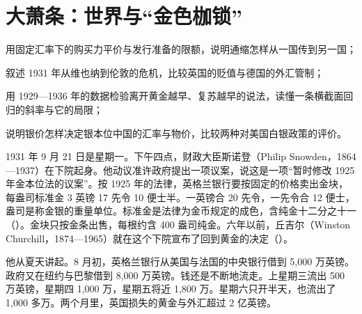 \chapter{大萧条：世界与“金色枷锁”}\label{ch:depressionworld}

\begin{chapterguide}
\begin{guidegoals}
\item 用固定汇率下的购买力平价与发行准备的限额，说明通缩怎样从一国传到另一国；
\item 叙述 1931 年从维也纳到伦敦的危机，比较英国的贬值与德国的外汇管制；
\item 用 1929—1936 年的数据检验离开黄金越早、复苏越早的说法，读懂一条横截面回归的斜率与它的局限；
\item 说明银价怎样决定银本位中国的汇率与物价，比较两种对美国白银政策的评价。
\end{guidegoals}
\end{chapterguide}

1931 年 9 月 21 日是星期一。下午四点，财政大臣斯诺登（Philip Snowden，1864—1937）在下院起身\cite{hansard1931,hansardpeople27}。他动议准许政府提出一项议案，说这是一项“暂时修改 1925 年金本位法的议案”\cite{hansard1931}。按 1925 年的法律，英格兰银行要按固定的价格卖出金块，每盎司标准金 3 英镑 17 先令 10 便士半\cite{hansard1931}。一英镑合 20 先令，一先令合 12 便士，盎司是称金银的重量单位。标准金是法律为金币规定的成色，含纯金十二分之十一（）。金块只按金条出售，每根约含 400 盎司纯金\cite{hansard1931}。六年以前，丘吉尔（Winston Churchill，1874—1965）就在这个下院宣布了回到黄金的决定（）。

他从夏天讲起。8 月初，英格兰银行从美国与法国的中央银行借到 5,000 万英镑\cite{hansard1931}。政府又在纽约与巴黎借到 8,000 万英镑\cite{hansard1931}。钱还是不断地流走。上星期三流出 500 万英镑，星期四 1,000 万，星期五将近 1,800 万\cite{hansard1931}。星期六只开半天，也流出了 1,000 多万\cite{hansard1931}。两个月里，英国损失的黄金与外汇超过 2 亿英镑\cite{hansard1931}。

